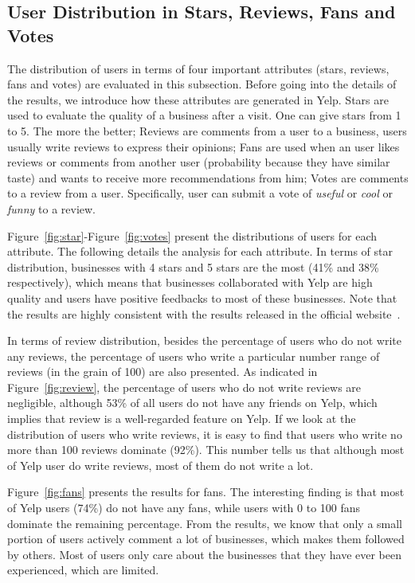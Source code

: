 \documentclass[10pt]{sig-alternate-10pt}   	%
\begin{document}
\subsection{User Distribution in Stars, Reviews, Fans and Votes}
The distribution of users in terms of four important attributes (stars, reviews, fans and votes) 
are evaluated in this subsection. Before going into the details of the results, we introduce how these 
attributes are 
generated in Yelp.  Stars are used to evaluate the quality of a business after a visit. One can give stars from 1 to 5. 
The more the better; Reviews are comments from a user to a business, users usually write reviews to 
express their opinions; Fans are used when an user likes reviews or comments from another user 
(probability because they have similar taste)  and wants to receive more recommendations from him; 
Votes are comments to a review from a user. Specifically, user can submit a vote of \textit{useful} or 
\textit{cool} or \textit{funny} to a review.  

Figure~\ref{fig:star}-Figure~\ref{fig:votes} present the distributions of users for each attribute. The following details 
the analysis for each attribute. In terms of star distribution, businesses with 4 stars and 5 stars are the most
(41\% and 38\% respectively), which means that businesses collaborated with Yelp are high quality and users
have positive feedbacks to most of these businesses. Note that the results are highly consistent with the 
results released in the official website~\cite{yelpdata}. 

In terms of review distribution, besides the percentage of users who do not write any reviews, the percentage of 
users who write a particular number range of reviews (in the grain of 100) are also presented.  As indicated in 
Figure~\ref{fig:review}, the percentage of users who do not write reviews are negligible, although 53\% of all 
users do not have any friends on Yelp, which implies that review is a well-regarded feature on Yelp.  
If we look at the distribution of users who write reviews, it is easy to find that users who write no more than 
100 reviews dominate (92\%). This number tells us that although most of Yelp user do write reviews, 
most of them do not write a lot. 

Figure~\ref{fig:fans} presents the results for fans. The interesting finding is that most of Yelp users (74\%) 
do not have any fans, while users with 0 to 100 fans dominate the remaining percentage. From the results, 
we know that only a small portion of users actively comment a lot of businesses, which makes them followed 
by others. Most of users only care about the businesses that they have ever been experienced, which are limited.
 
\end{document}
